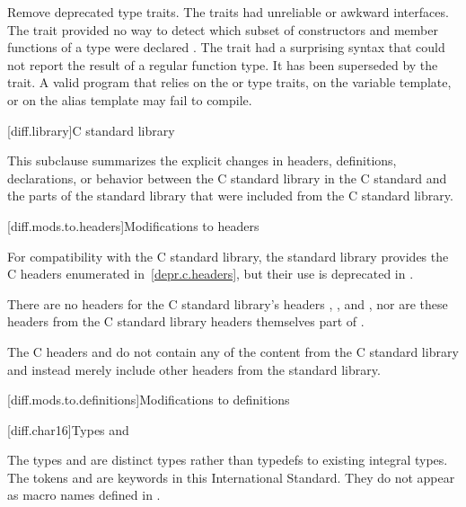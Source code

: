 \change Remove deprecated type traits.
\rationale
The traits had unreliable or awkward interfaces. The 
trait provided no way to detect which subset of constructors and member
functions of a type were declared . The 
trait had a surprising syntax that could not report the result of a regular
function type. It has been superseded by the  trait.
\effect
A valid \CppXVII{} program that relies on the  or
 type traits, on the  variable template,
or on the  alias template may fail to compile.

[diff.library]{C standard library}
%

\pnum
This subclause summarizes the explicit changes in headers,
definitions, declarations, or behavior between the C standard library
in the C standard and the parts of the \Cpp{} standard library that were
included from the C standard library.

[diff.mods.to.headers]{Modifications to headers}

\pnum
For compatibility with the C standard library,
the \Cpp{} standard library provides the C headers enumerated
in~\ref{depr.c.headers}, but their use is deprecated in \Cpp{}.

\pnum
There are no \Cpp{} headers for the C standard library's headers
,
,
and ,
nor are these headers from the C standard library headers themselves part of \Cpp{}.

\pnum
The C headers  and
 do not contain any of the content from
the C standard library and instead merely include other headers from the \Cpp{}
standard library.

[diff.mods.to.definitions]{Modifications to definitions}

[diff.char16]{Types  and }

\pnum
The types  and 
are distinct types rather than typedefs to existing integral types.
The tokens  and 
are keywords in this International Standard.
They do not appear as macro names defined in
.

